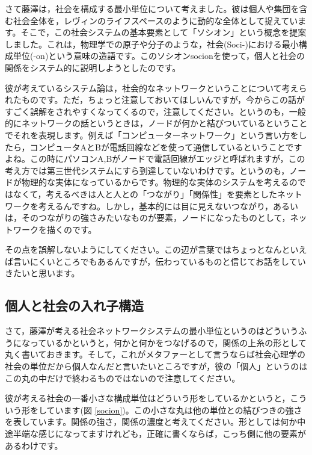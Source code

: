 \documentclass{ltjsbook}
\begin{document}
さて藤澤は，社会を構成する最小単位について考えました。彼は個人や集団を含む社会全体を，レヴィンのライフスペースのように動的な全体として捉えています。そこで，この社会システムの基本要素として「ソシオン」という概念を提案しました。これは，物理学での原子や分子のような，社会(Soci-)における最小構成単位(-on)という意味の造語です。このソシオンsocionを使って，個人と社会の関係をシステム的に説明しようとしたのです。

彼が考えているシステム論は，社会的なネットワークということについて考えられたものです。ただ，ちょっと注意しておいてほしいんですが，今からこの話がすごく誤解をされやすくなってくるので，注意してください。というのも，一般的にネットワークの話というときは，ノードが何かと結びついているということでそれを表現します。例えば「コンピューターネットワーク」という言い方をしたら，コンピュータAとBが電話回線などを使って通信しているということですよね。この時にパソコンA,Bがノードで電話回線がエッジと呼ばれますが，この考え方では第三世代システムにすら到達していないわけです。というのも，ノードが物理的な実体になっているからです。物理的な実体のシステムを考えるのではなくて，考えるべきは人と人との「つながり」「関係性」を要素としたネットワークを考えるんですね。しかし，基本的には目に見えないつながり，あるいは，そのつながりの強さみたいなものが要素，ノードになったものとして，ネットワークを描くのです。

その点を誤解しないようにしてください。この辺が言葉ではちょっとなんといえば言いにくいところでもあるんですが，伝わっているものと信じてお話をしていきたいと思います。

\subsection{個人と社会の入れ子構造}

さて，藤澤が考える社会ネットワークシステムの最小単位というのはどういうふうになっているかというと，何かと何かをつなげるので，関係の上糸の形として丸く書いておきます。そして，これがメタファーとして言うならば社会心理学の社会の単位だから個人なんだと言いたいところですが，彼の「個人」というのはこの丸の中だけで終わるものではないので注意してください。

彼が考える社会の一番小さな構成単位はどういう形をしているかというと，こういう形をしています(図 \ref{socion})。この小さな丸は他の単位との結びつきの強さを表しています。関係の強さ，関係の濃度と考えてください。形としては何か中途半端な感じになってますけれども，正確に書くならば，こっち側に他の要素があるわけです。
\end{document}
